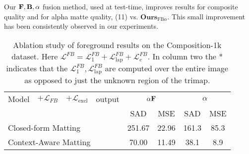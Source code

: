 \documentclass[runningheads]{llncs}
\begin{document}
Our $\mathbf{{{F}}}, \mathbf{{{B}}}, \alpha$ fusion method, used at test-time, improves results for composite quality and for alpha matte quality, (11) vs. {$\textbf{Ours}_{\mathrm{FB}\alpha}$}. This small improvement has been consistently observed in our experiments.


\begin{table}[t]
\centering
\caption{Ablation study of foreground results on the Composition-1k dataset. Here $\mathcal{L}^{FB}= \mathcal{L}^{FB}_1 + \mathcal{L}_{\mathrm{lap}}^{FB} + \mathcal{L}_{\mathrm{c}}^{FB}$. In column two the * indicates that the $\mathcal{L}^{FB}_1, \mathcal{L}_{\mathrm{lap}}^{FB}$ are computed over the entire image as opposed to just the unknown region of the trimap. }
\label{tab:comp1k_fg_ablation}
\setlength{\tabcolsep}{.5em}
\begin{tabular}{clclcccc}
  \toprule
 Model & $+ \mathcal{L}_{FB}$ & $+ \mathcal{L}_{\mathrm{excl}}$
  & output &   \multicolumn{2}{c}{ $\alpha \mathbf{{{F}}}$}  &
                                                                         \multicolumn{2}{c}{ $\alpha$} \\
  & & &  &   SAD & MSE       & SAD & MSE  \\ 
  \midrule
   \multicolumn{4}{l}{ Closed-form Matting~\cite{ClosedFormMattingPAMI}} & 251.67 & 22.96 & 161.3 & 85.3 \\ 
   \multicolumn{4}{l}{ Context-Aware Matting~\cite{ContextMatting}} & 70.00 & 11.49 & 38.1 &  8.9\\ 


\end{tabular}
\end{table}
\end{document}
